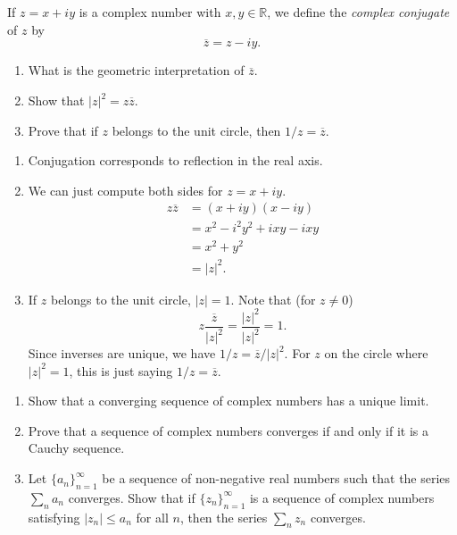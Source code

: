 \documentclass[12 pt, letterpaper]{hmcpset}
\begin{document}
\begin{problem}[2.]
	If $z = x + i y$ is a complex number with $x, y \in \mathbb{R}$, we define the \emph{complex conjugate} of $z$ by
	\[
		\overline{z} = z - i y.
	\]
	\begin{enumerate}
		\item What is the geometric interpretation of $\overline{z}$.
		\item Show that $\lvert z \rvert^{2} = z \overline{z}$.
		\item Prove that if $z$ belongs to the unit circle, then $1 / z = \overline{z}$.
	\end{enumerate}
\end{problem}

\begin{solution}
	\begin{enumerate}
		\item Conjugation corresponds to reflection in the real axis.
		\item We can just compute both sides for $z = x + i y$.
			\begin{align*}
				z \overline{z} & = (x + i y) (x - i y) \\
					       & = x^{2} - i^{2} y^{2} + i x y - i x y \\
					       & = x^{2} + y^{2} \\
					       & = \lvert z \rvert^{2}.
			\end{align*}
		\item If $z$ belongs to the unit circle, $\lvert z \rvert = 1$. Note that (for $z \neq 0$)
			\[
				z \frac{\overline{z}}{\lvert z \rvert^{2}} = \frac{\lvert z \rvert^{2}}{\lvert z \rvert^{2}} = 1.
			\]
			Since inverses are unique, we have  $1 / z = \overline{z} / \lvert z \rvert^{2}$. For $z$ on the circle where $\lvert z \rvert^{2} = 1$, this is just saying $1 / z = \overline{z}$.
	\end{enumerate}
\end{solution}

\pagebreak

\begin{problem}[3.]
	\begin{enumerate}
		\item Show that a converging sequence of complex numbers has a unique limit.
		\item Prove that a sequence of complex numbers converges if and only if it is a Cauchy sequence.
		\item  Let $\{ a_{n} \}_{n = 1}^{\infty}$ be a sequence of non-negative real numbers such that the series $\sum_{n} a_{n}$ converges. Show that if $\{ z_{n} \}_{n = 1}^{\infty}$ is a sequence of complex numbers satisfying $\lvert z_{n} \rvert \le a_{n}$ for all $n$, then the series $\sum_{n} z_{n}$ converges.
	\end{enumerate}
\end{problem}
\end{document}
